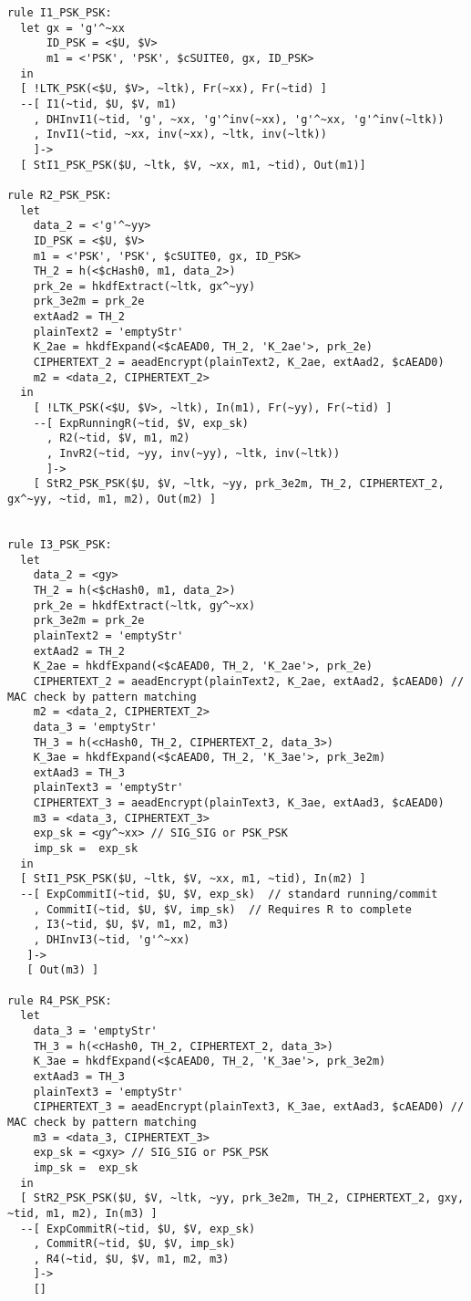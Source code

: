 \begin{lstlisting}
rule I1_PSK_PSK:
  let gx = 'g'^~xx
      ID_PSK = <$U, $V>
      m1 = <'PSK', 'PSK', $cSUITE0, gx, ID_PSK> 
  in
  [ !LTK_PSK(<$U, $V>, ~ltk), Fr(~xx), Fr(~tid) ]
  --[ I1(~tid, $U, $V, m1)
    , DHInvI1(~tid, 'g', ~xx, 'g'^inv(~xx), 'g'^~xx, 'g'^inv(~ltk))
    , InvI1(~tid, ~xx, inv(~xx), ~ltk, inv(~ltk))
    ]->
  [ StI1_PSK_PSK($U, ~ltk, $V, ~xx, m1, ~tid), Out(m1)]

rule R2_PSK_PSK:
  let
    data_2 = <'g'^~yy>
    ID_PSK = <$U, $V>
    m1 = <'PSK', 'PSK', $cSUITE0, gx, ID_PSK>
    TH_2 = h(<$cHash0, m1, data_2>)
    prk_2e = hkdfExtract(~ltk, gx^~yy)
    prk_3e2m = prk_2e
    extAad2 = TH_2
    plainText2 = 'emptyStr'
    K_2ae = hkdfExpand(<$cAEAD0, TH_2, 'K_2ae'>, prk_2e)
    CIPHERTEXT_2 = aeadEncrypt(plainText2, K_2ae, extAad2, $cAEAD0)
    m2 = <data_2, CIPHERTEXT_2>
  in
    [ !LTK_PSK(<$U, $V>, ~ltk), In(m1), Fr(~yy), Fr(~tid) ]
    --[ ExpRunningR(~tid, $V, exp_sk)
      , R2(~tid, $V, m1, m2)
      , InvR2(~tid, ~yy, inv(~yy), ~ltk, inv(~ltk))
      ]->
    [ StR2_PSK_PSK($U, $V, ~ltk, ~yy, prk_3e2m, TH_2, CIPHERTEXT_2, gx^~yy, ~tid, m1, m2), Out(m2) ]


rule I3_PSK_PSK:
  let
    data_2 = <gy> 
    TH_2 = h(<$cHash0, m1, data_2>)
    prk_2e = hkdfExtract(~ltk, gy^~xx)
    prk_3e2m = prk_2e
    plainText2 = 'emptyStr' 
    extAad2 = TH_2
    K_2ae = hkdfExpand(<$cAEAD0, TH_2, 'K_2ae'>, prk_2e)
    CIPHERTEXT_2 = aeadEncrypt(plainText2, K_2ae, extAad2, $cAEAD0) // MAC check by pattern matching
    m2 = <data_2, CIPHERTEXT_2>
    data_3 = 'emptyStr' 
    TH_3 = h(<cHash0, TH_2, CIPHERTEXT_2, data_3>)
    K_3ae = hkdfExpand(<$cAEAD0, TH_2, 'K_3ae'>, prk_3e2m)
    extAad3 = TH_3
    plainText3 = 'emptyStr'
    CIPHERTEXT_3 = aeadEncrypt(plainText3, K_3ae, extAad3, $cAEAD0)
    m3 = <data_3, CIPHERTEXT_3>
    exp_sk = <gy^~xx> // SIG_SIG or PSK_PSK
    imp_sk =  exp_sk
  in
  [ StI1_PSK_PSK($U, ~ltk, $V, ~xx, m1, ~tid), In(m2) ]
  --[ ExpCommitI(~tid, $U, $V, exp_sk)  // standard running/commit
    , CommitI(~tid, $U, $V, imp_sk)  // Requires R to complete
    , I3(~tid, $U, $V, m1, m2, m3)
    , DHInvI3(~tid, 'g'^~xx)
   ]->
   [ Out(m3) ]

rule R4_PSK_PSK:
  let
    data_3 = 'emptyStr' 
    TH_3 = h(<cHash0, TH_2, CIPHERTEXT_2, data_3>)
    K_3ae = hkdfExpand(<$cAEAD0, TH_2, 'K_3ae'>, prk_3e2m)
    extAad3 = TH_3
    plainText3 = 'emptyStr'
    CIPHERTEXT_3 = aeadEncrypt(plainText3, K_3ae, extAad3, $cAEAD0) // MAC check by pattern matching
    m3 = <data_3, CIPHERTEXT_3>
    exp_sk = <gxy> // SIG_SIG or PSK_PSK
    imp_sk =  exp_sk
  in
  [ StR2_PSK_PSK($U, $V, ~ltk, ~yy, prk_3e2m, TH_2, CIPHERTEXT_2, gxy, ~tid, m1, m2), In(m3) ]
  --[ ExpCommitR(~tid, $U, $V, exp_sk)
    , CommitR(~tid, $U, $V, imp_sk)
    , R4(~tid, $U, $V, m1, m2, m3)
    ]->
    []
\end{lstlisting}


